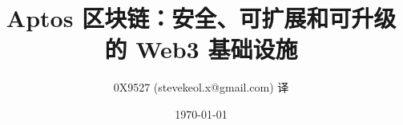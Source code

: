 \documentclass{article}
\title{Aptos 区块链：安全、可扩展和可升级的 Web3 基础设施}
\author{0X9527 (stevekeol.x@gmail.com) 译}
\date{\today}
\begin{document}
\maketitle

\renewcommand{\abstractname}{摘要}
\renewcommand{\figurename}{图}
\end{document}
